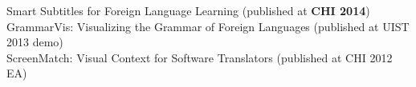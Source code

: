 \documentclass[margin,line]{resume}
\begin{document}
\begin{resume}
Smart Subtitles for Foreign Language Learning (published at \textbf{CHI 2014})\\ %
GrammarVis: Visualizing the Grammar of Foreign Languages (published at UIST 2013 demo)\\ %
ScreenMatch: Visual Context for Software Translators (published at CHI 2012 EA)\\ %


\end{resume}
\end{document}
